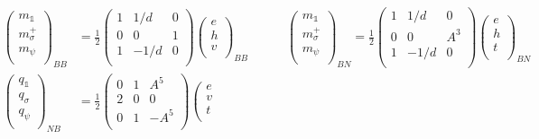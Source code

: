 \documentclass[12pt,a4paper]{article}
\newcommand{\unit}{\mathds{1}}
\begin{document}
\begin{figure}
  \centering
\begin{align}
\nonumber
\left( \begin{matrix}
m_\unit \\
m_\sigma^+\\
m_\psi \\
\end{matrix} \right)_{BB} 
&= \frac{1}{2}\left( \begin{matrix}
1&1/d&0\\
0&0&1\\
1&-1/d&0\\
\end{matrix} \right)
\left( \begin{matrix}
e\\
h\\
v\\
\end{matrix} \right)_{BB}
\quad \quad \quad
\left( \begin{matrix}
m_\unit \\
m_\sigma^+\\
m_\psi \\
\end{matrix} \right)_{BN} 
= \frac{1}{2}\left( \begin{matrix}
1&1/d&0\\
0&0&A^3\\
1&-1/d&0\\
\end{matrix} \right)
\left( \begin{matrix}
e\\
h\\
t\\
\end{matrix} \right)_{BN}\\
\nonumber
\left( \begin{matrix}
q_\unit \\
q_\sigma\\
q_\psi \\
\end{matrix} \right)_{NB} 
&= \frac{1}{2}\left( \begin{matrix}
0&1&A^5\\
2&0&0\\
0&1&-A^5\\
\end{matrix} \right)
\left( \begin{matrix}
e\\
v\\
t\\

\end{matrix}
\end{align}
\end{figure}
\end{document}
